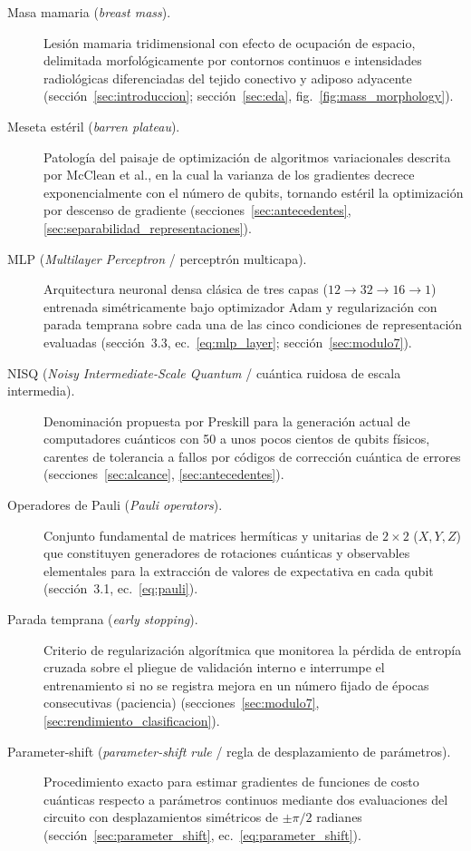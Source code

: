 \begin{description}
  \item[Masa mamaria (\textit{breast mass}).] Lesión mamaria tridimensional con efecto de ocupación de espacio, delimitada morfológicamente por contornos continuos e intensidades radiológicas diferenciadas del tejido conectivo y adiposo adyacente (sección~\ref{sec:introduccion}; sección~\ref{sec:eda}, fig.~\ref{fig:mass_morphology}).

  \item[Meseta estéril (\textit{barren plateau}).] Patología del paisaje de optimización de algoritmos variacionales descrita por McClean et al., en la cual la varianza de los gradientes decrece exponencialmente con el número de qubits, tornando estéril la optimización por descenso de gradiente (secciones~\ref{sec:antecedentes}, \ref{sec:separabilidad_representaciones}).

  \item[MLP (\textit{Multilayer Perceptron} / perceptrón multicapa).] Arquitectura neuronal densa clásica de tres capas ($12 \to 32 \to 16 \to 1$) entrenada simétricamente bajo optimizador Adam y regularización con parada temprana sobre cada una de las cinco condiciones de representación evaluadas (sección~3.3, ec.~\ref{eq:mlp_layer}; sección~\ref{sec:modulo7}).

  \item[NISQ (\textit{Noisy Intermediate-Scale Quantum} / cuántica ruidosa de escala intermedia).] Denominación propuesta por Preskill para la generación actual de computadores cuánticos con 50 a unos pocos cientos de qubits físicos, carentes de tolerancia a fallos por códigos de corrección cuántica de errores (secciones~\ref{sec:alcance}, \ref{sec:antecedentes}).

  \item[Operadores de Pauli (\textit{Pauli operators}).] Conjunto fundamental de matrices hermíticas y unitarias de $2 \times 2$ ($X, Y, Z$) que constituyen generadores de rotaciones cuánticas y observables elementales para la extracción de valores de expectativa en cada qubit (sección~3.1, ec.~\ref{eq:pauli}).

  \item[Parada temprana (\textit{early stopping}).] Criterio de regularización algorítmica que monitorea la pérdida de entropía cruzada sobre el pliegue de validación interno e interrumpe el entrenamiento si no se registra mejora en un número fijado de épocas consecutivas (paciencia) (secciones~\ref{sec:modulo7}, \ref{sec:rendimiento_clasificacion}).

  \item[Parameter-shift (\textit{parameter-shift rule} / regla de desplazamiento de parámetros).] Procedimiento exacto para estimar gradientes de funciones de costo cuánticas respecto a parámetros continuos mediante dos evaluaciones del circuito con desplazamientos simétricos de $\pm \pi/2$ radianes (sección~\ref{sec:parameter_shift}, ec.~\ref{eq:parameter_shift}).


\end{description}
